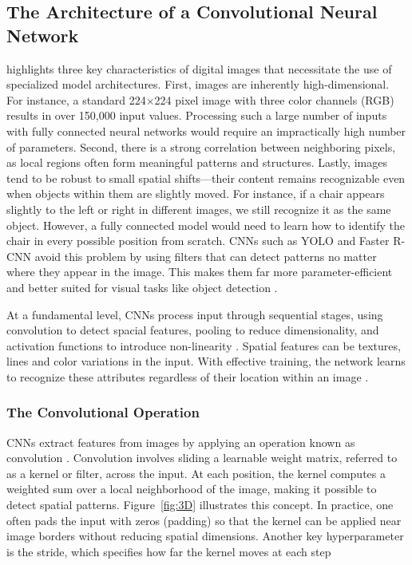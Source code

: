 \documentclass[a4paper,10pt,twocolumn]{article}
\numberwithin{figure}{section}
\numberwithin{table}{section}
\begin{document}
\vspace{0.3cm}
\subsection{{The Architecture of a Convolutional Neural Network}}
\vspace{0.3cm}

\cite{prince2023understanding} highlights three key characteristics of
digital images that necessitate the use of specialized model architectures. 
First, images are inherently high-dimensional. For instance, a standard 224×224 
pixel image with three color channels (RGB) results in over 150,000 input values. 
Processing such a large number of inputs with fully connected neural networks would 
require an impractically high number of parameters. Second, there is a strong correlation 
between neighboring pixels, as local regions often form meaningful patterns and structures. 
Lastly, images tend to be robust to small spatial shifts—their content remains recognizable 
even when objects within them are slightly moved. For instance, if a chair appears slightly 
to the left or right in different images, we still recognize it as the same object. 
However, a fully connected model would need to learn how to identify the chair in every 
possible position from scratch. CNNs such as YOLO and 
Faster R-CNN avoid this problem by using filters that can detect 
patterns no matter where they appear in the image. This makes them far more parameter-efficient and 
better suited for visual tasks like object detection \citep{prince2023understanding}.

At a fundamental level, CNNs process input through sequential stages, 
using convolution to detect spacial features, pooling to 
reduce dimensionality, and activation functions to 
introduce non-linearity \cite{10589380TEST}.
Spatial features can be textures, lines and color variations in the input. 
With effective training, the network learns to recognize 
these attributes regardless of their location within an image \citep[Chapter~2]{VerdhanVaibhav2021CVUD}.

\vspace{0.3cm}
\subsubsection{The Convolutional Operation}
\vspace{0.3cm}

CNNs extract features from images by applying an operation known as convolution \cite[p.~170]{prince2023understanding}. Convolution involves sliding a learnable weight matrix, referred to as a kernel or filter, across the input. At each position, the kernel computes a weighted sum over a local neighborhood of the image, making it possible to detect spatial patterns. Figure~\ref{fig:3D} illustrates this concept. In practice, one often pads the input with zeros (padding) so that the kernel can be applied near image borders without reducing spatial dimensions. Another key hyperparameter is the stride, which specifies how far the kernel moves at each step \cite[p.~165]{prince2023understanding}
\end{document}
